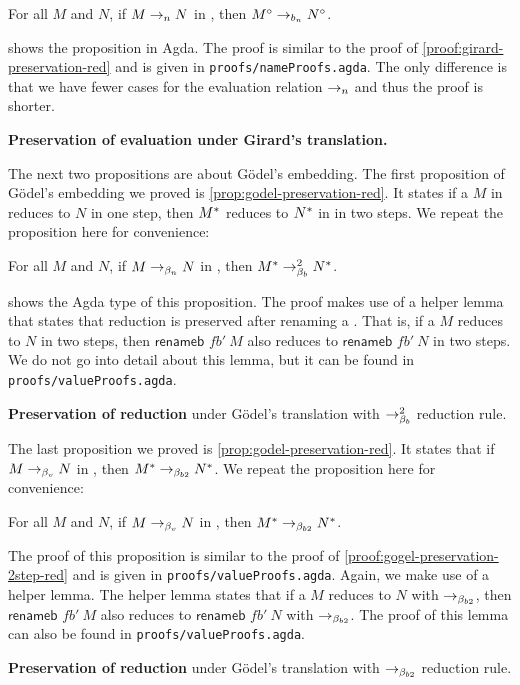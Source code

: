 \begin{center}
 For all \lterm $M$ and $N$, if $M \to_n N$ in \lan, then ${M}^\circ \to_{b_n} {N}^\circ$.
\end{center}

 shows the proposition in Agda.
The proof is similar to the proof of \cref{proof:girard-preservation-red} and is given in \texttt{proofs/nameProofs.agda}.
The only difference is that we have fewer cases for the evaluation relation $\to_n$ and thus the proof is shorter.

\begin{proposition}
  \label{proof:girard-preservation-eval}
  \textbf{Preservation of evaluation under Girard's translation.} 
  \small
  
\end{proposition}

The next two propositions are about Gödel's embedding.
The first proposition of Gödel's embedding we proved is \cref{prop:godel-preservation-red}.
It states if a \lterm $M$ in \lav reduces to $N$ in one step, then ${M}^*$ reduces to ${N}^*$ in \lab in two steps.
We repeat the proposition here for convenience:
\begin{center}
 For all \lterms $M$ and $N$, if $M \to_{\beta_n} N$ in \lav, then ${M}^* \to_{\beta_b}^2 {N}^*$.
\end{center}
 shows the Agda type of this proposition.
The proof makes use of a helper lemma that states that reduction is preserved after renaming a \lterm.
That is, if a \lterm $M$ reduces to $N$ in two steps, then $\textsf{renameb } fb' \ M$ also reduces to $\textsf{renameb } fb' \ N$ in two steps.
We do not go into detail about this lemma, but it can be found in \texttt{proofs/valueProofs.agda}.

\begin{proposition}
  \label{proof:gogel-preservation-2step-red}
  \textbf{Preservation of reduction} under Gödel's translation with $\to_{\beta_b}^2$ reduction rule.
  \small
  
\end{proposition}

The last proposition we proved is \cref{prop:godel-preservation-red}.
It states that if $M \to_{\beta_v} N$ in \lav, then ${M}^* \to_{\beta_{b2}} {N}^*$.
We repeat the proposition here for convenience:
\begin{center}
 For all \lterms $M$ and $N$, if $M \to_{\beta_v} N$ in \lan, then ${M}^* \to_{\beta_{b2}} {N}^*$.
\end{center}
The proof of this proposition is similar to the proof of \cref{proof:gogel-preservation-2step-red} and is given in \texttt{proofs/valueProofs.agda}.
Again, we make use of a helper lemma. The helper lemma states that if a \lterm $M$ reduces to $N$ with $\to_{\beta_{b2}}$, then $\textsf{renameb } fb' \ M$ also reduces to $\textsf{renameb } fb' \ N$ with $\to_{\beta_{b2}}$.
The proof of this lemma can also be found in \texttt{proofs/valueProofs.agda}.

\begin{proposition}
  \label{proof:godel-preservation-red}
  \textbf{Preservation of reduction} under Gödel's translation with $\to_{\beta_{b2}}$ reduction rule.
  \small
  
\end{proposition}

